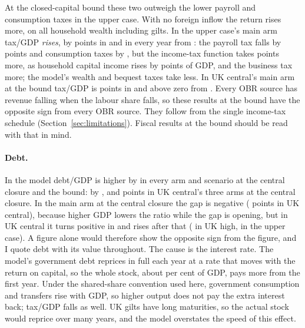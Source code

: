 At the closed-capital bound these two outweigh the lower payroll and consumption taxes in the upper case. With no foreign inflow the return rises more, on all household wealth including gilts. In the upper case's main arm tax/GDP \emph{rises}, by \genKorinekMainTaxGdpPpBoundAbs{} points in \genHeadYear{} and in every year from \genKorinekMainTaxFirstPosBound{}: the payroll tax falls by \genKorinekMainBoundTaxPayrollAbs{} points and consumption taxes by \genKorinekMainBoundTaxConsumptionAbs{}, but the income-tax function takes \genKorinekMainBoundTaxIncomeAbs{} points more, as household capital income rises by \genKorinekMainBoundHhCapIncPpAbs{} points of GDP, and the business tax \genKorinekMainBoundTaxBusinessAbs{} more; the model's wealth and bequest taxes take \genKorinekMainBoundTaxOtherAbs{} less. In UK central's main arm at the bound tax/GDP is \genUkCentralMainTaxGdpPpBound{} points in \genHeadYear{} and above zero from \genUkCentralMainTaxFirstPosBound{}. Every OBR source has revenue falling when the labour share falls, so these results at the bound have the opposite sign from every OBR source. They follow from the single income-tax schedule (Section~\ref{sec:limitations}). Fiscal results at the bound should be read with that in mind.

\paragraph{Debt.} In the model debt/GDP is higher by \genDebtRuleYear{} in every arm and scenario at the central closure and the bound: by \genUkCentralMainDebtPpThirtySixCentralAbs{}, \genUkCentralFlatDebtPpThirtySixCentralAbs{} and \genUkCentralStressDebtPpThirtySixCentralAbs{} points in UK central's three arms at the central closure. In the main arm at the central closure the \genHeadYear{} gap is negative (\genUkCentralMainDebtPpCentral{} points in UK central), because higher GDP lowers the ratio while the gap is opening, but in UK central it turns positive in \genUkCentralMainDebtFirstPosCentral{} and rises after that (\genUkHighMainDebtFirstPosCentral{} in UK high, \genKorinekMainDebtFirstPosCentral{} in the upper case). A \genHeadYear{} figure alone would therefore show the opposite sign from the \genDebtRuleYear{} figure, and I quote debt with its \genDebtRuleYear{} value throughout. The cause is the interest rate. The model's government debt reprices in full each year at a rate that moves with the return on capital, so the whole stock, about \genBaseDebtGdpShockRoundCentral{} per cent of GDP, pays more from the first year. Under the shared-share convention used here, government consumption and transfers rise with GDP, so higher output does not pay the extra interest back; tax/GDP falls as well. UK gilts have long maturities, so the actual stock would reprice over many years, and the model overstates the speed of this effect.

